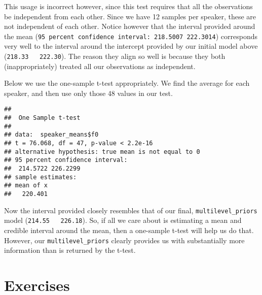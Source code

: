 \documentclass[
]{book}
\newenvironment{Shaded}{\begin{snugshade}}{\end{snugshade}}
\newcommand{\AttributeTok}[1]{\textcolor[rgb]{0.77,0.63,0.00}{#1}}
\newcommand{\FunctionTok}[1]{\textcolor[rgb]{0.00,0.00,0.00}{#1}}
\newcommand{\NormalTok}[1]{#1}
\newcommand{\OtherTok}[1]{\textcolor[rgb]{0.56,0.35,0.01}{#1}}
\newcommand{\SpecialCharTok}[1]{\textcolor[rgb]{0.00,0.00,0.00}{#1}}
\begin{document}
This usage is incorrect however, since this test requires that all the observations be independent from each other. Since we have 12 samples per speaker, these are not independent of each other. Notice however that the interval provided around the mean (\texttt{95\ percent\ confidence\ interval:\ 218.5007\ 222.3014}) corresponds very well to the interval around the intercept provided by our initial model above (\texttt{218.33\ \ \ 222.30}). The reason they align so well is because they both (inappropriately) treated all our observations as independent.

Below we use the one-sample t-test appropriately. We find the average for each speaker, and then use only those 48 values in our test.

\begin{Shaded}
\end{Shaded}

\begin{verbatim}
## 
##  One Sample t-test
## 
## data:  speaker_means$f0
## t = 76.068, df = 47, p-value < 2.2e-16
## alternative hypothesis: true mean is not equal to 0
## 95 percent confidence interval:
##  214.5722 226.2299
## sample estimates:
## mean of x 
##   220.401
\end{verbatim}

Now the interval provided closely resembles that of our final, \texttt{multilevel\_priors} model (\texttt{214.55\ \ \ 226.18}). So, if all we care about is estimating a mean and credible interval around the mean, then a one-sample t-test will help us do that. However, our \texttt{multilevel\_priors} clearly provides us with substantially more information than is returned by the t-test.

\hypertarget{exercises-1}{%
\section{Exercises}\label{exercises-1}}
\end{document}
